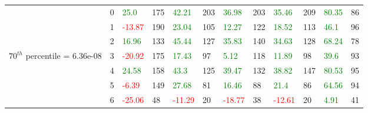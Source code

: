 \begin{table}[htb!]
\begin{adjustwidth}{-0.9in}{-0.9in}
\begin{tabular}{|p{5em}|p{2em}|p{3em}|p{3em}|p{3em}|p{3em}|p{3em}|p{3em}|p{3em}|p{3em}|p{3em}|p{3em}|}
            & 0 & \textcolor{green}{25.0} & 175 & \textcolor{green}{42.21} & 203 & \textcolor{green}{36.98} & 203 & \textcolor{green}{35.46} & 209 & \textcolor{green}{80.35} & 86\\\cline{3-12}
            & 1 & \textcolor{red}{-13.87} & 190 & \textcolor{green}{23.04} & 105 & \textcolor{green}{12.27} & 122 & \textcolor{green}{18.52} & 113 & \textcolor{green}{46.1} & 96\\\cline{3-12}
            & 2 & \textcolor{green}{16.96} & 133 & \textcolor{green}{45.44} & 127 & \textcolor{green}{35.83} & 140 & \textcolor{green}{34.63} & 128 & \textcolor{green}{68.24} & 78\\\cline{3-12}
            $70^{th}$ percentile = 6.36e-08 & 3 & \textcolor{red}{-20.92} & 175 & \textcolor{green}{17.43} & 97 & \textcolor{green}{5.12} & 118 & \textcolor{green}{11.89} & 98 & \textcolor{green}{39.6} & 93\\\cline{3-12}
            & 4 & \textcolor{green}{24.58} & 158 & \textcolor{green}{43.3} & 125 & \textcolor{green}{39.47} & 132 & \textcolor{green}{38.82} & 147 & \textcolor{green}{80.53} & 95\\\cline{3-12}
            & 5 & \textcolor{red}{-6.39} & 149 & \textcolor{green}{27.68} & 81 & \textcolor{green}{16.46} & 88 & \textcolor{green}{21.4} & 86 & \textcolor{green}{64.56} & 94\\\cline{3-12}
            & 6 & \textcolor{red}{-25.06} & 48 & \textcolor{red}{-11.29} & 20 & \textcolor{red}{-18.77} & 38 & \textcolor{red}{-12.61} & 20 & \textcolor{green}{4.91} & 41\\\hline\hline
            

\end{tabular}
\end{adjustwidth}
\end{table}
